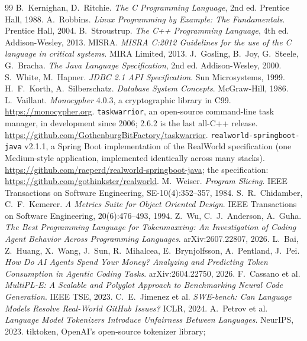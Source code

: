 \documentclass[journal]{IEEEtran}
\begin{document}
\begin{thebibliography}{99}
 B.~Kernighan, D.~Ritchie. \emph{The C Programming Language},
2nd ed. Prentice Hall, 1988.
 A.~Robbins. \emph{Linux Programming by Example: The
Fundamentals}. Prentice Hall, 2004.
 B.~Stroustrup. \emph{The C++ Programming Language},
4th ed. Addison-Wesley, 2013.
 MISRA. \emph{MISRA C:2012 Guidelines for the use of the C
language in critical systems}. MIRA Limited, 2013.
 J.~Gosling, B.~Joy, G.~Steele, G.~Bracha. \emph{The Java
Language Specification}, 2nd ed. Addison-Wesley, 2000.
 S.~White, M.~Hapner. \emph{JDBC 2.1 API Specification}. Sun
Microsystems, 1999.
 H.~F.~Korth, A.~Silberschatz. \emph{Database System
Concepts}. McGraw-Hill, 1986.
 L.~Vaillant. \emph{Monocypher} 4.0.3, a
cryptographic library in C99. \url{https://monocypher.org}.
 \texttt{taskwarrior}, an open-source command-line
task manager, in development since 2006; 2.6.2 is the last all-C++ release.
\url{https://github.com/GothenburgBitFactory/taskwarrior}.
 \texttt{realworld-springboot-java} v2.1.1, a Spring
Boot implementation of the RealWorld specification (one Medium-style
application, implemented identically across many stacks).
\url{https://github.com/raeperd/realworld-springboot-java}; the
specification: \url{https://github.com/gothinkster/realworld}.
 M.~Weiser. \emph{Program Slicing}. IEEE Transactions on
Software Engineering, SE-10(4):352--357, 1984.
 S.~R.~Chidamber, C.~F.~Kemerer. \emph{A Metrics Suite for
Object Oriented Design}. IEEE Transactions on Software Engineering,
20(6):476--493, 1994.
 Z.~Wu, C.~J.~Anderson, A.~Guha. \emph{The Best Programming Language for Tokenmaxxing:
An Investigation of Coding Agent Behavior Across Programming Languages}.
arXiv:2607.22807, 2026.
 L.~Bai, Z.~Huang, X.~Wang, J.~Sun, R.~Mihalcea, E.~Brynjolfsson, A.~Pentland, J.~Pei. \emph{How Do AI Agents Spend Your Money? Analyzing and
Predicting Token Consumption in Agentic Coding Tasks}. arXiv:2604.22750,
2026.
 F.~Cassano et al. \emph{MultiPL-E: A Scalable and
Polyglot Approach to Benchmarking Neural Code Generation}. IEEE TSE, 2023.
 C.~E.~Jimenez et al. \emph{SWE-bench: Can Language Models
Resolve Real-World GitHub Issues?} ICLR, 2024.
 A.~Petrov et al. \emph{Language Model Tokenizers
Introduce Unfairness Between Languages}. NeurIPS, 2023.
 tiktoken, OpenAI's open-source tokenizer library;

\end{thebibliography}
\end{document}
